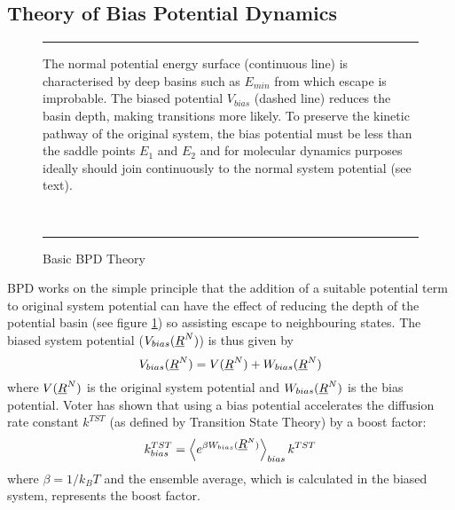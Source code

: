 \subsection{Theory of Bias Potential Dynamics}
\begin{figure}[ht]
\hrule
\vspace{1.0cm}
\begin{center}
\centerline{}
\end{center}
\caption{Basic BPD Theory\label{bpdfig}}
The normal potential energy surface (continuous line) is characterised
by deep basins such as $E_{min}$ from which escape is improbable. The
biased potential $V_{bias}$ (dashed line) reduces the basin depth,
making transitions more likely. To preserve the kinetic pathway of the
original system, the bias potential must be less than the saddle
points $E_1$ and $E_2$ and for molecular dynamics purposes ideally should
join continuously to the normal system potential (see text).

~
\hrule
\end{figure}
BPD works on the simple principle that the addition of a suitable
potential term to original system potential can have the effect of
reducing the depth of the potential basin (see figure \ref{bpdfig}) so
assisting escape to neighbouring states. The biased system potential
($V_{bias}(\mbox{$\underline{R}$}^{N})$) is thus given by
\begin{equation}
V_{bias}(\mbox{$\underline{R}$}^{N})=V(\mbox{$\underline{R}$}^{N})+W_{bias}(\mbox{$\underline{R}$}^{N}) \label{sbias}
\end{equation}
where $V(\mbox{$\underline{R}$}^{N})$ is the original system potential and
$W_{bias}(\mbox{$\underline{R}$}^{N})$ is the bias potential.
Voter \cite{voter-97a} has shown that using a bias potential
accelerates the diffusion rate constant $k^{TST}$ (as defined by
Transition State Theory) by a boost factor:
\begin{equation}
 k^{TST}_{bias}=\left <e^{\beta W_{bias}(\mbox{$\underline{R}$}^{N})}\right
 >_{bias} k^{TST} \label{boost}
\end{equation}
where $\beta=1/k_BT$ and the ensemble average, which is calculated in the
biased system, represents the boost factor.

